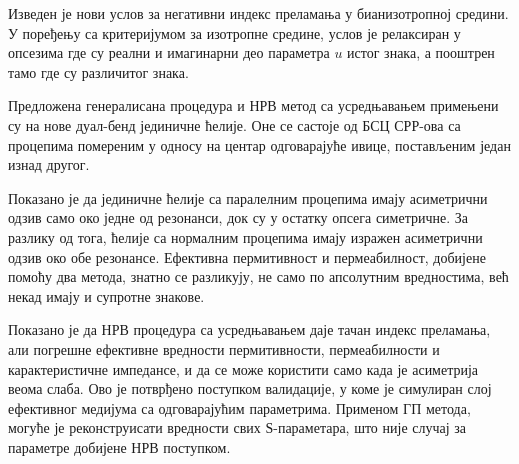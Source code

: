 Изведен је нови услов за негативни индекс преламања у бианизотропној средини. У поређењу са критеријумом за изотропне средине, услов је релаксиран у опсезима где су реални и имагинарни део параметра $u$ истог знака, а пооштрен тамо где су различитог знака.

Предложена генералисана процедура и НРВ метод са усредњавањем примењени су на нове дуал-бенд јединичне ћелије. Оне се састоје од БСЦ СРР-ова са процепима помереним у односу на центар одговарајуће ивице, постављеним један изнад другог.

Показано је да јединичне ћелије са паралелним процепима имају асиметрични одзив само око једне од резонанси, док су у остатку опсега симетричне. За разлику од тога, ћелије са нормалним процепима имају изражен асиметрични одзив око обе резонансе. Ефективна пермитивност и пермеабилност, добијене помоћу два метода, знатно се разликују, не само по апсолутним вредностима, већ некад имају и супротне знакове.

Показано је да НРВ процедура са усредњавањем даје тачан индекс преламања, али погрешне ефективне вредности пермитивности, пермеабилности и карактеристичне импедансе, и да се може користити само када је асиметрија веома слаба. Ово је потврђено поступком валидације, у коме је симулиран слој ефективног медијума са одговарајућим параметрима. Применом ГП метода, могуће је реконструисати вредности свих $Ѕ$-параметара, што није случај за параметре добијене НРВ поступком.
